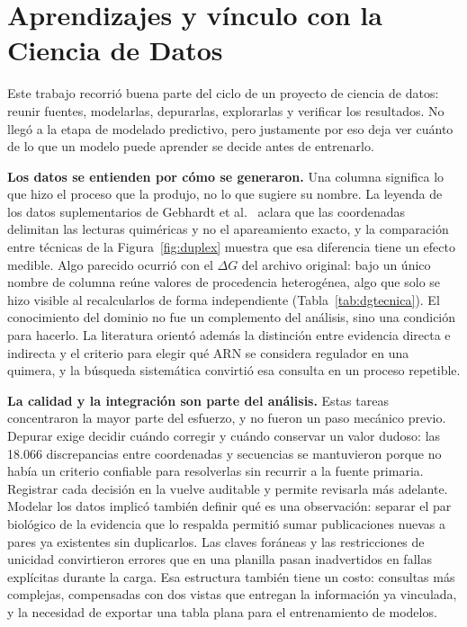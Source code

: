 \documentclass[11pt,a4paper]{article}
\newcommand{\dG}{$\Delta G$}
\newcommand{\codigo}[1]{\texttt{\detokenize{#1}}}
\begin{document}
\section{Aprendizajes y vínculo con la Ciencia de Datos}

Este trabajo recorrió buena parte del ciclo de un proyecto de ciencia de datos: reunir fuentes, modelarlas, depurarlas, explorarlas y verificar los resultados. No llegó a la etapa de modelado predictivo, pero justamente por eso deja ver cuánto de lo que un modelo puede aprender se decide antes de entrenarlo.

\textbf{Los datos se entienden por cómo se generaron.} Una columna significa lo que hizo el proceso que la produjo, no lo que sugiere su nombre. La leyenda de los datos suplementarios de Gebhardt et al.\ \cite{gebhardt2023} aclara que las coordenadas delimitan las lecturas quiméricas y no el apareamiento exacto, y la comparación entre técnicas de la Figura~\ref{fig:duplex} muestra que esa diferencia tiene un efecto medible. Algo parecido ocurrió con el \dG{} del archivo original: bajo un único nombre de columna reúne valores de procedencia heterogénea, algo que solo se hizo visible al recalcularlos de forma independiente (Tabla~\ref{tab:dgtecnica}). El conocimiento del dominio no fue un complemento del análisis, sino una condición para hacerlo. La literatura orientó además la distinción entre evidencia directa e indirecta y el criterio para elegir qué ARN se considera regulador en una quimera, y la búsqueda sistemática convirtió esa consulta en un proceso repetible.

\textbf{La calidad y la integración son parte del análisis.} Estas tareas concentraron la mayor parte del esfuerzo, y no fueron un paso mecánico previo. Depurar exige decidir cuándo corregir y cuándo conservar un valor dudoso: las 18.066 discrepancias entre coordenadas y secuencias se mantuvieron porque no había un criterio confiable para resolverlas sin recurrir a la fuente primaria. Registrar cada decisión en \codigo{qc_issue} la vuelve auditable y permite revisarla más adelante. Modelar los datos implicó también definir qué es una observación: separar el par biológico de la evidencia que lo respalda permitió sumar publicaciones nuevas a pares ya existentes sin duplicarlos. Las claves foráneas y las restricciones de unicidad convirtieron errores que en una planilla pasan inadvertidos en fallas explícitas durante la carga. Esa estructura también tiene un costo: consultas más complejas, compensadas con dos vistas que entregan la información ya vinculada, y la necesidad de exportar una tabla plana para el entrenamiento de modelos.
\end{document}
